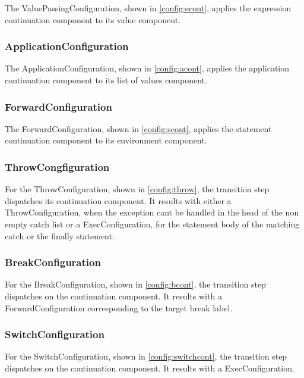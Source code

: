 \documentclass{article}
\begin{document}
The ValuePassingConfiguration, shown in \ref{config:econt}, applies the expression continuation component to its value component.

\subsubsection{ApplicationConfiguration}
\label{subsubsec:applicationconfig}

The ApplicationConfiguration, shown in \ref{config:acont}, applies the application continuation component to its list of values component.

\subsubsection{ForwardConfiguration}
\label{subsubsec:forwardconfig}

The ForwardConfiguration, shown in \ref{config:scont}, applies the statement continuation component to its environment component.

\subsubsection{ThrowCongfiguration}
\label{subsubsec:throwconfig}

For the ThrowConfiguration, shown in \ref{config:throw}, the transition step dispatches its continuation component.
It results with either a ThrowConfiguration, when  the exception cant be handled in the head of the non empty catch list or a ExecConfiguration, for the statement body of the matching catch or the finally statement.

\subsubsection{BreakConfiguration}
\label{subsubsec:breakconfig}

For the BreakConfiguration, shown in \ref{config:bcont}, the transition step dispatches on the continuation component.
It results with a ForwardConfiguration corresponding to the target break label.

\subsubsection{SwitchConfiguration}
\label{subsubsec:switchconfig}

For the SwitchConfiguration, shown in \ref{config:switchcont}, the transition step dispatches on the continuation component.
It results with a ExecConfiguration.
\end{document}
